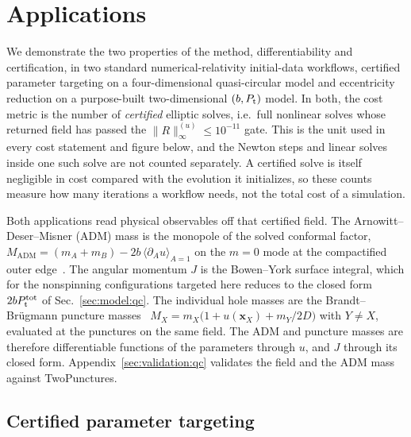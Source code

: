 \documentclass[
  aps,
  prd,
  twocolumn,
  10pt,
  amsmath,
  amssymb,
  nofootinbib,
  superscriptaddress,
  floatfix,
]{revtex4-2}
\newcommand{\vect}[1]{\boldsymbol{#1}}
\newcommand{\Madm}{M_{\mathrm{ADM}}}
\newif\ifshowreferee \showrefereetrue
\newcommand{\refereetext}[1]{\ifshowreferee{\color{refereepurple}#1}\else#1\fi}
\begin{document}
\section{Applications}
\label{sec:applications}
We demonstrate the two properties of the method, differentiability and certification, in two standard numerical-relativity initial-data workflows, certified parameter targeting on a
four-dimensional quasi-circular model and eccentricity reduction on a
purpose-built two-dimensional $(b,P_{\rm t})$ model.
In both, the cost metric is the number of \emph{certified} elliptic solves, i.e.\ full nonlinear solves
whose returned field has passed the $\|R\|^{(u)}_\infty\le10^{-11}$ gate.
This is the unit used in every cost statement and figure below, and the Newton steps and linear solves inside one such solve are not counted separately.
\refereetext{A certified solve is itself negligible in cost compared with the evolution it initializes, so these counts measure how many iterations a workflow needs, not the total cost of a simulation.}

Both applications read physical observables off that certified field. The
Arnowitt--Deser--Misner (ADM) mass is the monopole of the solved conformal factor,
$\Madm=(m_A+m_B)-2b\,\langle\partial_A u\rangle_{A=1}$ on the $m=0$ mode at the
compactified outer edge~\cite{BaumgarteShapiro2010}.
The angular momentum $J$ is the Bowen--York surface integral, which for the nonspinning configurations targeted here reduces to the
closed form $2bP_{\rm t}^{\rm tot}$ of Sec.~\ref{sec:model:qc}.
The individual hole masses are the Brandt--Br\"ugmann puncture masses~\cite{BrandtBruegmann1997}
$M_X=m_X\bigl(1+u(\vect{x}_X)+m_Y/2D\bigr)$ with $Y\neq X$, evaluated at the
punctures on the same field.
The ADM and puncture masses are therefore differentiable functions of the parameters through $u$, and $J$ through its closed form.
Appendix~\ref{sec:validation:qc} validates the field and the ADM mass against TwoPunctures.

\subsection{Certified parameter targeting}
\label{sec:applications:targeting}
\end{document}
